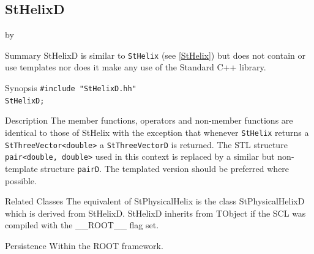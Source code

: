 \documentclass[twoside]{article}
\newcommand{\name}[1]{\textsf{#1}}%
\newcommand{\entrylabel}[1]{\mbox{\textbf{{#1}}}\hfil}%
\newenvironment{entry}
{\begin{list}{}%
    {\renewcommand{\makelabel}{\entrylabel}%
     \setlength{\labelwidth}{90pt}%
     \setlength{\leftmargin}{\labelwidth}
     \advance\leftmargin by \labelsep%
      }%
    }%
  {\end{list}}
\newcommand{\Entrylabel}[1]%
{\raisebox{0pt}[1ex][0pt]{\makebox[\labelwidth][l]%
    {\parbox[t]{\labelwidth}{\hspace{0pt}\textbf{{#1}}}}}}
\newenvironment{Entry}%
{\renewcommand{\entrylabel}{\Entrylabel}\begin{entry}}%
  {\end{entry}}
\begin{document}
\subsection{StHelixD } \label{StHelixD}
\begin{Entry}
\item[Summary]
    StHelixD is similar to \texttt{StHelix}
    (see \ref{StHelix}) but does not contain or use templates nor
    does it make any use of the Standard C++ library. 
    
\item[Synopsis]
    \verb+#include "StHelixD.hh"+ \\
    \verb+StHelixD;+
    
    
\item[Description]       
    The member functions, operators and non-member functions are identical
    to those of StHelix with the exception that whenever \texttt{StHelix} returns a
    \verb+StThreeVector<double>+ a \texttt{StThreeVectorD} is returned.
    The STL structure \verb+pair<double, double>+ used in this context is replaced
    by a similar but non-template structure \texttt{pairD}. 
    The templated version should be preferred where possible.

\item[Related Classes]
    The equivalent of StPhysicalHelix is the class StPhysicalHelixD which is
    derived from StHelixD. StHelixD inherits from TObject 
    if the SCL was compiled with the \name{\_\_ROOT\_\_} flag set.

\item[Persistence]
    Within the ROOT framework.

\end{Entry}

\clearpage

%
%
\end{document}
